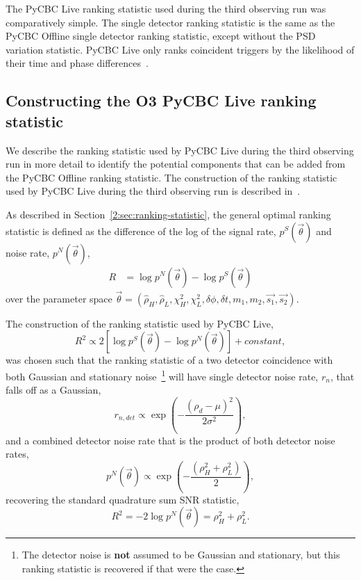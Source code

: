 The PyCBC Live ranking statistic used during the third observing run was comparatively simple. The single detector ranking statistic is the same as the PyCBC Offline single detector ranking statistic, except without the PSD variation statistic. PyCBC Live only ranks coincident triggers by the likelihood of their time and phase differences~\cite{PyCBC_Live:2018}.

\subsection{\label{5:sec:old-stat-construction}Constructing the O3 PyCBC Live ranking statistic}

We describe the ranking statistic used by PyCBC Live during the third observing run in more detail to identify the potential components that can be added from the PyCBC Offline ranking statistic. The construction of the ranking statistic used by PyCBC Live during the third observing run is described in~\cite{PyCBC_Live:2018}.

As described in Section~\ref{2:sec:ranking-statistic}, the general optimal ranking statistic is defined as the difference of the log of the signal rate, $ p^{S}(\Vec{\theta})$ and noise rate,  $p^{N}(\Vec{\theta})$,
%
\begin{align}
    R &= \log p^{N}(\Vec{\theta}) - \log p^{S}(\Vec{\theta})
\end{align}
%
over the parameter space $\Vec{\theta} = \left(\hat{\rho}_{H}, \hat{\rho}_{L}, \chi^{2}_{H}, \chi^{2}_{L}, \delta\phi, \delta t, m_{1}, m_{2}, \Vec{s_{1}}, \Vec{s_{2}}\right)$. 

The construction of the ranking statistic used by PyCBC Live,
%
\begin{equation}
    R^{2} \propto 2 [\log p^{S}(\Vec{\theta}) - \log p^{N}(\Vec{\theta})] + constant,
    \label{5:eqn:general-detection-statistic}
\end{equation}
%
was chosen such that the ranking statistic of a two detector coincidence with both Gaussian and stationary noise~\footnote{The detector noise is \textbf{not} assumed to be Gaussian and stationary, but this ranking statistic is recovered if that were the case.} will have single detector noise rate, $r_{n}$, that falls off as a Gaussian,
%
\begin{equation}
    r_{n,det} \propto \exp \left( -\frac{(\rho_d - \mu)^2}{2 \sigma^2} \right),
    \label{5:eqn:old-noise-rate}
\end{equation}
%
and a combined detector noise rate that is the product of both detector noise rates,
%
\begin{equation}
    p^{N}(\Vec{\theta}) \propto \exp \left( -\frac{(\rho_{H}^{2} + \rho_{L}^{2})}{2} \right),
    \label{5:eqn:old-comb-noise-rate}
\end{equation}
%
recovering the standard quadrature sum SNR statistic,
%
\begin{equation}
    R^{2} = -2 \log p^{N}(\Vec{\theta}) = \rho^{2}_{H} + \rho^{2}_{L} .
\end{equation}

